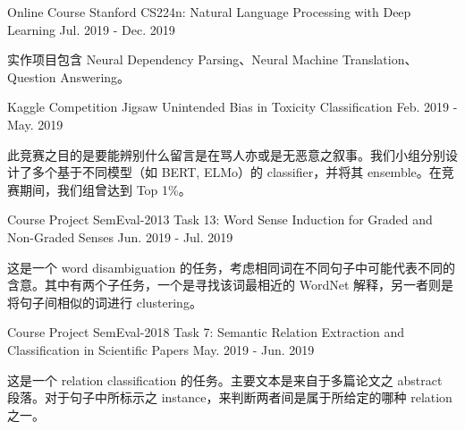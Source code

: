 \begin{cventries}
  \cventry
    {Online Course} %
    {Stanford CS224n: Natural Language Processing with Deep Learning} %
    {} %
    {Jul. 2019 - Dec. 2019} %
    {
      \begin{cvitems} %
        \item {实作项目包含 Neural Dependency Parsing、Neural Machine Translation、Question Answering。}
      \end{cvitems}
    }

  \cventry
    {Kaggle Competition} %
    {Jigsaw Unintended Bias in Toxicity Classification} %
    {} %
    {Feb. 2019 - May. 2019} %
    {
      \begin{cvitems} %
        \item {此竞赛之目的是要能辨别什么留言是在骂人亦或是无恶意之叙事。我们小组分别设计了多个基于不同模型（如 BERT, ELMo）的 classifier，并将其 ensemble。在竞赛期间，我们组曾达到 Top 1\%。}
      \end{cvitems}
    }

  \cventry
    {Course Project} %
    {SemEval-2013 Task 13: Word Sense Induction for Graded and Non-Graded Senses} %
    {} %
    {Jun. 2019 - Jul. 2019} %
    {
      \begin{cvitems} %
        \item {这是一个 word disambiguation 的任务，考虑相同词在不同句子中可能代表不同的含意。其中有两个子任务，一个是寻找该词最相近的 WordNet 解释，另一者则是将句子间相似的词进行 clustering。}
      \end{cvitems}
    }

  \cventry
    {Course Project} %
    {SemEval-2018 Task 7: Semantic Relation Extraction and Classification in Scientific Papers} %
    {} %
    {May. 2019 - Jun. 2019} %
    {
      \begin{cvitems} %
        \item {这是一个 relation classification 的任务。主要文本是来自于多篇论文之 abstract 段落。对于句子中所标示之 instance，来判断两者间是属于所给定的哪种 relation 之一。}
      \end{cvitems}
    }


\end{cventries}
